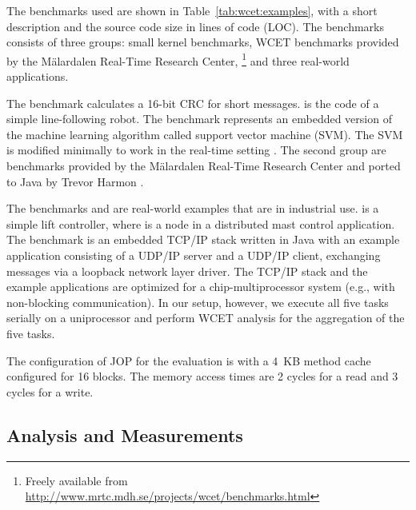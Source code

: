 The benchmarks used are shown in Table~\ref{tab:wcet:examples}, with
a short description and the source code size in lines of code (LOC).
The benchmarks consists of three groups: small kernel benchmarks,
WCET benchmarks provided by the M\"alardalen Real-Time Research
Center,
 \footnote{Freely available from \url{http://www.mrtc.mdh.se/projects/wcet/benchmarks.html}}
and three real-world applications.

The benchmark  calculates a 16-bit CRC for short messages.
 is the code of a simple line-following robot. The
 benchmark represents an embedded version of the machine
learning algorithm called support vector machine (SVM). The SVM is
modified minimally to work in the real-time setting
\cite{hardreal2006pedersen}. The second group are benchmarks provided
by the M\"alardalen Real-Time Research Center \cite{mrtc:bench} and
ported to Java by Trevor Harmon \cite{jop:volta:rtas2008}.

The benchmarks  and  are real-world examples
that are in industrial use.  is a simple lift controller,
where  is a node in a distributed mast control application.
The  benchmark is an embedded TCP/IP stack written in
Java with an example application consisting of a UDP/IP server and a
UDP/IP client, exchanging messages via a loopback network layer
driver. The TCP/IP stack and the example applications are optimized
for a chip-multiprocessor system (e.g., with non-blocking
communication). In our setup, however, we execute all five tasks
serially on a uniprocessor and perform WCET analysis for the
aggregation of the five tasks.


The configuration of JOP for the evaluation is with a 4~KB method
cache configured for 16 blocks. The memory access times are 2 cycles
for a read and 3 cycles for a write.


\subsection{Analysis and Measurements}
\label{sec:benchwcet}



